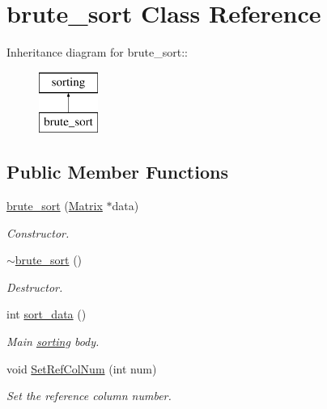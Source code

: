 \hypertarget{classbrute__sort}{
\section{brute\_\-sort Class Reference}
\label{d3/d39/classbrute__sort}
}
Inheritance diagram for brute\_\-sort::\begin{figure}[H]
\begin{center}
\leavevmode
\includegraphics[height=2cm]{d3/d39/classbrute__sort}
\end{center}
\end{figure}
\subsection*{Public Member Functions}
\begin{DoxyCompactItemize}
\item 
\hyperlink{classbrute__sort_a2dbbb3b1c89d6a5720d79a5bf150ad1f}{brute\_\-sort} (\hyperlink{classMatrix}{Matrix} $\ast$data)
\begin{DoxyCompactList}\small\item\em Constructor. \item\end{DoxyCompactList}\item 
\hypertarget{classbrute__sort_a0c5f47456d59d36d8b2370196d953b81}{
\hyperlink{classbrute__sort_a0c5f47456d59d36d8b2370196d953b81}{$\sim$brute\_\-sort} ()}
\label{d3/d39/classbrute__sort_a0c5f47456d59d36d8b2370196d953b81}

\begin{DoxyCompactList}\small\item\em Destructor. \item\end{DoxyCompactList}\item 
\hypertarget{classbrute__sort_a377b8811e92553a66cdb6780c43e16e6}{
int \hyperlink{classbrute__sort_a377b8811e92553a66cdb6780c43e16e6}{sort\_\-data} ()}
\label{d3/d39/classbrute__sort_a377b8811e92553a66cdb6780c43e16e6}

\begin{DoxyCompactList}\small\item\em Main \hyperlink{classsorting}{sorting} body. \item\end{DoxyCompactList}\item 
\hypertarget{classbrute__sort_a7d43275af73d67695f2736dcada07b86}{
void \hyperlink{classbrute__sort_a7d43275af73d67695f2736dcada07b86}{SetRefColNum} (int num)}
\label{d3/d39/classbrute__sort_a7d43275af73d67695f2736dcada07b86}

\begin{DoxyCompactList}\small\item\em Set the reference column number. \item\end{DoxyCompactList}\end{DoxyCompactItemize}


